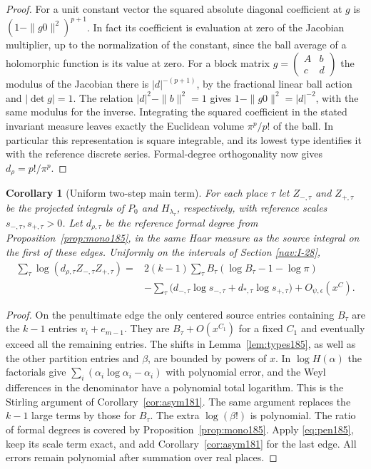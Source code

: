 \documentclass[a4paper,11pt]{article}
\newtheorem{corollary}[proposition]{Corollary}
\theoremstyle{definition}
\theoremstyle{remark}
\numberwithin{equation}{section}
\begin{document}
\begin{proof}
For a unit constant vector the squared absolute diagonal
coefficient at \(g\) is \((1-\|g0\|^2)^{p+1}\).
In fact its coefficient is evaluation at zero of the
Jacobian multiplier, up to the normalization of the
constant, since the ball average of a holomorphic function
is its value at zero. For a block matrix
\(g=\left(\begin{smallmatrix}A&b\\c&d\end{smallmatrix}\right)\)
the modulus of the Jacobian there is \(|d|^{-(p+1)}\),
by the fractional linear ball action and \(|\det g|=1\).
The relation \(|d|^2-\|b\|^2=1\) gives
\(1-\|g0\|^2=|d|^{-2}\), with the same modulus for the
inverse. Integrating the squared coefficient in the stated
invariant measure leaves exactly the Euclidean volume
\(\pi^p/p!\) of the ball. In particular this representation
is square integrable, and its lowest type identifies it
with the reference discrete series. Formal-degree
orthogonality now gives \(d_\rho=p!/\pi^p\).
\end{proof}

\begin{corollary}[Uniform two-step main term]
\label{cor:twomain185}
For each place \(\tau\) let \(Z_{-,\tau}\) and \(Z_{+,\tau}\)
be the projected integrals of \(P_0\) and \(H_{\lambda_\tau}\),
respectively, with reference scales \(s_{-,\tau},s_{+,\tau}>0\).
Let \(d_{\rho,\tau}\) be the reference formal degree from
Proposition~\ref{prop:mono185}, in the same Haar measure
as the source integral on the first of these edges. Uniformly
on the intervals of Section \ref{nav:I-28},
\begin{align*}
 \sum_\tau \log (d_{\rho,\tau} Z_{-,\tau}Z_{+,\tau})
   ={}&2(k-1)\sum_\tau B_\tau(\log B_\tau-1-\log\pi)\\
      &-\sum_\tau\big(d_{-,\tau}\log s_{-,\tau}
                     +d_{*,\tau}\log s_{+,\tau}\big)
         +O_{\psi,\epsilon}(x^C).
\end{align*}
\end{corollary}
\begin{proof}
On the penultimate edge the only centered source entries
containing \(B_\tau\) are the \(k-1\) entries \(v_i+e_{m-1}\).
They are \(B_\tau+O(x^{C_1})\) for a fixed \(C_1\) and
eventually exceed all the remaining entries. The shifts
in Lemma~\ref{lem:types185}, as well as the other partition
entries and \(\beta\), are bounded by powers of \(x\).
In \(\log H(\alpha)\) the factorials give
\(\sum_i(\alpha_i\log\alpha_i-\alpha_i)\) with polynomial
error, and the Weyl differences in the denominator have
a polynomial total logarithm. This is the Stirling argument
of Corollary~\ref{cor:asym181}. The same argument replaces
the \(k-1\) large terms by those for \(B_\tau\).
The extra \(\log(\beta!)\) is polynomial. The ratio of
formal degrees is covered by Proposition~\ref{prop:mono185}.
Apply \eqref{eq:pen185}, keep its scale term exact, and
add Corollary~\ref{cor:asym181} for the last edge. All
errors remain polynomial after summation over real places.
\end{proof}
\end{document}
